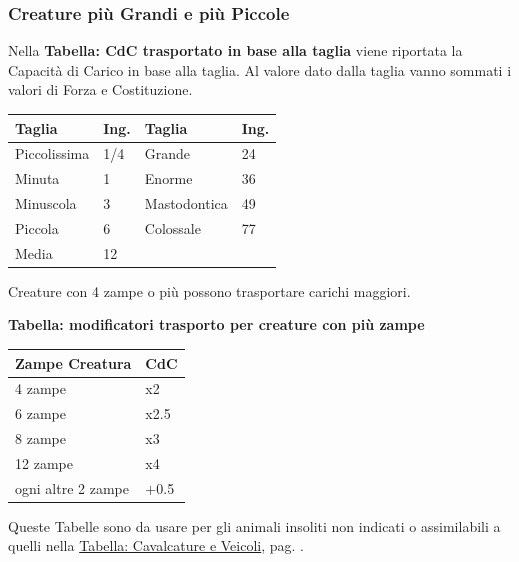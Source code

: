 \begin{multicols}{2}
\subsubsection{Creature più Grandi e più Piccole}\label{tagliaeportata}

Nella \textbf{Tabella: CdC trasportato in base alla taglia} viene riportata la Capacità di Carico in base alla taglia. Al valore dato dalla taglia vanno sommati i valori di Forza e Costituzione.

\medskip

\noindent\begin{tabularx}{\linewidth}{Xl|ll}
	\toprule
\textbf{Taglia}& \textbf{Ing.}&\textbf{Taglia} & \textbf{Ing.}\\
\toprule
Piccolissima &1/4& Grande & 24\\
Minuta & 1 & Enorme& 36\\
Minuscola & 3& Mastodontica&49\\
Piccola & 6 & Colossale&77\\
Media & 12&&
\end{tabularx}

\medskip

Creature con 4 zampe o più possono trasportare carichi maggiori.


\textbf{Tabella: modificatori trasporto per creature con più zampe}

\medskip

\noindent\begin{tabularx}{\linewidth}{Xl}
	\toprule
\textbf{Zampe Creatura}&\textbf{CdC}\\
\toprule
4 zampe & x2\\
6 zampe & x2.5\\
8 zampe & x3\\
12 zampe & x4\\
ogni altre 2 zampe & +0.5
\end{tabularx}

\medskip

Queste Tabelle sono da usare per gli animali insoliti non indicati o assimilabili a quelli nella \hyperlink{TabellaCavalcatureeVeicoli}{Tabella: Cavalcature e Veicoli}, pag. \pageref{TabellaCavalcatureeVeicoli}.


\end{multicols}
